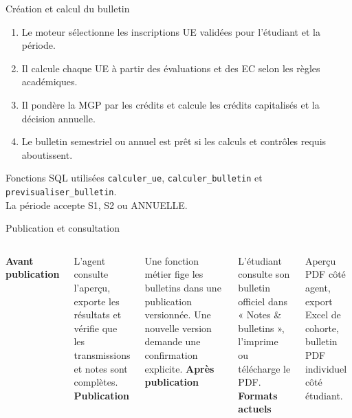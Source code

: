 \documentclass[aspectratio=169,12pt]{beamer}
\begin{document}
\begin{frame}{Création et calcul du bulletin}
  \begin{enumerate}
    \item Le moteur sélectionne les inscriptions UE validées pour l’étudiant et la période.
    \item Il calcule chaque UE à partir des évaluations et des EC selon les règles académiques.
    \item Il pondère la MGP par les crédits et calcule les crédits capitalisés et la décision annuelle.
    \item Le bulletin semestriel ou annuel est prêt si les calculs et contrôles requis aboutissent.
  \end{enumerate}
  \vspace{.5em}
  \begin{block}{Fonctions SQL utilisées}
    \texttt{calculer\_ue}, \texttt{calculer\_bulletin} et \texttt{previsualiser\_bulletin}.\\
    La période accepte S1, S2 ou ANNUELLE.
  \end{block}
\end{frame}

\begin{frame}{Publication et consultation}
  \begin{columns}[T,onlytextwidth]
      \textbf{Avant publication}\par\smallskip
      L’agent consulte l’aperçu, exporte les résultats et vérifie que les transmissions et notes sont complètes.\\[.9em]
      \textbf{Publication}\par\smallskip
      Une fonction métier fige les bulletins dans une publication versionnée. Une nouvelle version demande une confirmation explicite.
      \textbf{Après publication}\par\smallskip
      L’étudiant consulte son bulletin officiel dans « Notes \& bulletins », l’imprime ou télécharge le PDF.\\[.9em]
      \textbf{Formats actuels}\par\smallskip
      Aperçu PDF côté agent, export Excel de cohorte, bulletin PDF individuel côté étudiant.
  \end{columns}
\end{frame}
\end{document}
